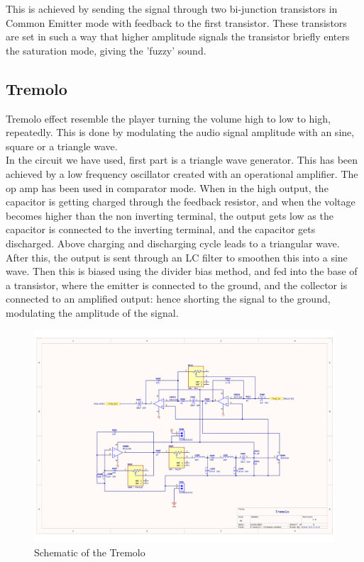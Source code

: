 \documentclass{article}
\begin{document}
                This is achieved by sending the signal through two bi-junction transistors in Common Emitter mode with feedback to the first transistor. These transistors are set in such a way that higher amplitude signals the transistor briefly enters the saturation mode, giving the 'fuzzy' sound.
                
            \subsection{Tremolo}
                Tremolo effect resemble the player turning the volume high to low to high, repeatedly. This is done by modulating the audio signal amplitude with an sine, square or a triangle wave.\\

                In the circuit we have used, first part is a triangle wave generator. This has been achieved by a low frequency oscillator created with an operational amplifier. The op amp has been used in comparator mode. When in the high output, the capacitor is getting charged through the feedback resistor, and when the voltage becomes higher than the non inverting terminal, the output gets low as the capacitor is connected to the inverting terminal, and the capacitor gets discharged. Above charging and discharging cycle leads to a triangular wave. \\

                After this, the output is sent through an LC filter to smoothen this into a sine wave. Then this is biased using the divider bias method, and fed into the base of a transistor, where the emitter is connected to the ground, and the collector is connected to an amplified output: hence shorting the signal to the ground, modulating the amplitude of the signal.
  
                \begin{figure}
                    \centering
                    \includegraphics[scale=0.4]{tremolo.png}
                    \caption{Schematic of the Tremolo}
                    \label{fig:enter-label}
                \end{figure}
                
\end{document}
